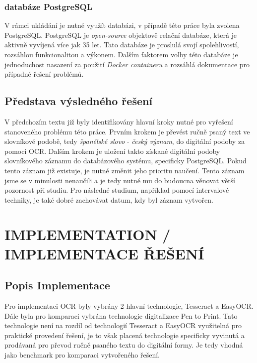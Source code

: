 \documentclass[journal]{IEEEtran}
\begin{document}
\subsubsection{databáze PostgreSQL}
V rámci ukládání je nutné využít databázi, v případě této práce byla zvolena PostgreSQL.
PostgreSQL je \textit{open-source} objektově relační databáze, která je aktivně vyvíjená více jak 35 let.
Tato databáze je proslulá svojí spolehlivostí, rozsáhlou funkcionalitou a výkonem.
Dalším faktorem volby této databáze je jednoduchost nasazení za použití \textit{Docker containeru} a rozsáhlá dokumentace pro případné řešení problémů.\cite{postgre}

\subsection{Představa výsledného řešení}
V předchozím textu již byly identifikovány hlavní kroky nutné pro vyřešení stanoveného problému této práce.
Prvním krokem je převést ručně psaný text ve slovníkové podobě, tedy \textit{španělské slovo} - \textit{český význam}, do digitální podoby za pomoci \ac{OCR}.
Dalším krokem je uložení takto získané digitální podoby slovníkového záznamu do databázového systému, specificky PostgreSQL.\cite{postgre}
Pokud tento záznam již existuje, je nutné změnit jeho prioritu naučení.
Tento záznam jsme se v minulosti nenaučili a je tedy nutné mu do budoucna věnovat větší pozornost při studiu.
Pro následné studium, například pomocí intervalové techniky, je také dobré zachovávat datum, kdy byl záznam vytvořen.


\section{IMPLEMENTATION / IMPLEMENTACE ŘEŠENÍ}

\subsection{Popis Implementace}
Pro implementaci \ac{OCR} byly vybrány 2 hlavní technologie, Tesseract\cite{tesseract} a EasyOCR\cite{easy_ocr}.
Dále byla pro komparaci vybrána technologie digitalizace Pen to Print\cite{pen_to_print}.
Tato technologie není na rozdíl od technologií Tesseract a EasyOCR využitelná pro praktické provedení řešení, je to však placená technologie specificky vyvinutá a prodávaná pro převod ručně psaného textu do digitální formy. Je tedy vhodná jako benchmark pro komparaci vytvořeného řešení.
\end{document}
